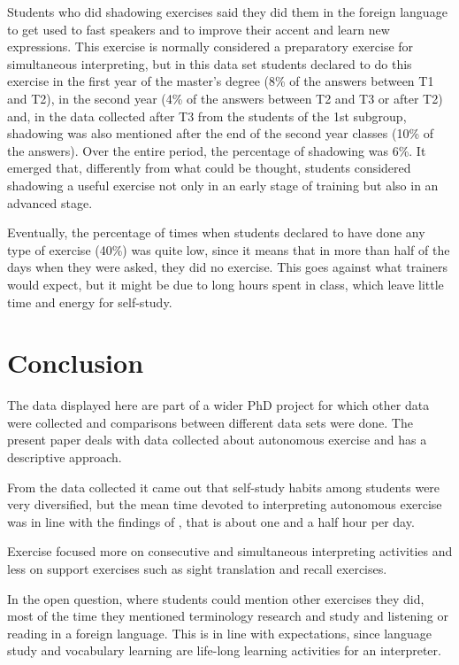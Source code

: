 \documentclass[output=paper]{../langscibook}
\begin{document}
Students who did shadowing exercises said they did them in the foreign language to get used to fast speakers and to improve their accent and learn new expressions. This exercise is normally considered a preparatory exercise for simultaneous interpreting, but in this data set students declared to do this exercise in the first year of the master’s degree (8\% of the answers between T1 and T2), in the second year (4\% of the answers between T2 and T3 or after T2) and, in the data collected after T3 from the students of the 1st subgroup, shadowing was also mentioned after the end of the second year classes (10\% of the answers). Over the entire period, the percentage of shadowing was 6\%. It emerged that, differently from what could be thought, students considered shadowing a useful exercise not only in an early stage of training but also in an advanced stage.

Eventually, the percentage of times when students declared to have done any type of exercise (40\%) was quite low, since it means that in more than half of the days when they were asked, they did no exercise. This goes against what trainers would expect, but it might be due to long hours spent in class, which leave little time and energy for self-study.


\section{Conclusion}


The data displayed here are part of a wider PhD project for which other data were collected and comparisons between different data sets were done. The present paper deals with data collected about autonomous exercise and has a descriptive approach.

From the data collected it came out that self-study habits among students were very diversified, but the mean time devoted to interpreting autonomous exercise was in line with the findings of \citet{Fan2012}, that is about one and a half hour per day.

Exercise focused more on consecutive and simultaneous interpreting activities and less on support exercises such as sight translation and recall exercises.

In the open question, where students could mention other exercises they did, most of the time they mentioned terminology research and study and listening or reading in a foreign language. This is in line with expectations, since language study and vocabulary learning are life-long learning activities for an interpreter.
\end{document}
